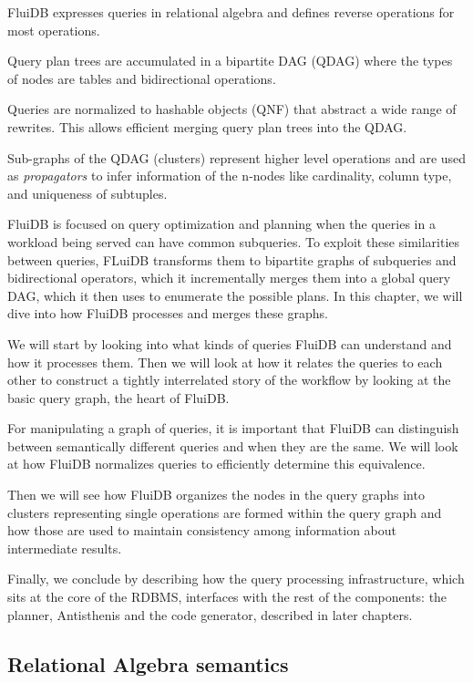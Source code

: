 \begin{summary}
\item FluiDB expresses queries in relational algebra and defines 
  reverse operations for most operations.
\item Query plan trees are accumulated in a bipartite DAG (QDAG) 
  where the types of nodes are tables and bidirectional operations.
\item Queries are normalized to hashable objects (QNF) that abstract a wide 
   range of rewrites. This allows efficient merging query plan trees into the QDAG.
\item Sub-graphs of the QDAG (clusters) represent higher level operations
  and are used as \emph{propagators} to infer information of the n-nodes 
  like cardinality, column type, and uniqueness of subtuples.
\end{summary}

FluiDB is focused on query optimization and planning when the queries in a workload being served can have common subqueries.
To exploit these similarities between queries, FLuiDB transforms them to bipartite graphs of subqueries and bidirectional operators,
which it incrementally merges them into a global query DAG, which it then uses to enumerate the possible plans. 
In this chapter, we will dive into how FluiDB processes and merges these graphs. 

We will start by looking into what kinds of queries FluiDB
can understand and how it processes them. Then we will look at how it relates
the queries to each other to construct a tightly interrelated story
of the workflow by looking at the basic query graph, the heart of
FluiDB. 

For manipulating a graph of queries, it is important that FluiDB can distinguish between semantically different queries and when they are the same.
We will look at how FluiDB normalizes queries to efficiently determine this equivalence. 

Then we will see how FluiDB organizes the nodes in the query graphs into  clusters representing single operations are formed within the query
graph and how those are used to maintain consistency among information about
intermediate results. 

Finally, we conclude by describing how the query
processing infrastructure, which sits at the core of the RDBMS,
interfaces with the rest of the components: the planner, Antisthenis
and the code generator, described in later chapters.

\subsection{Relational Algebra semantics}
\label{sec:relational_algebra_semantics}


